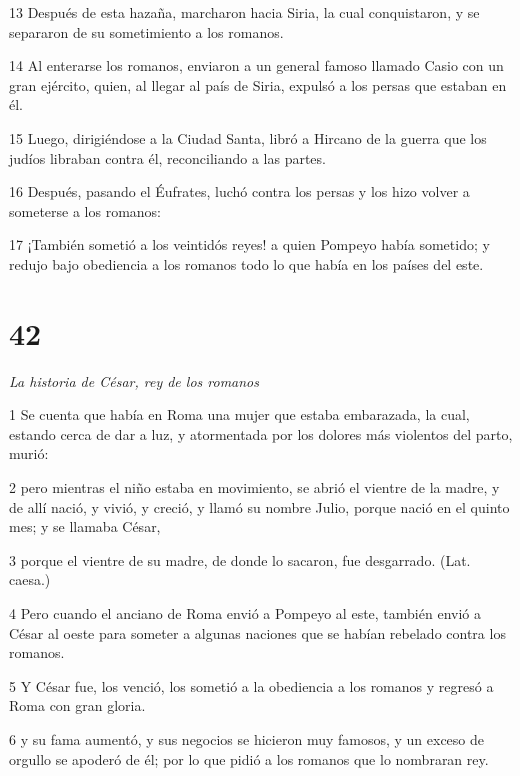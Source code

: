 \par 13 Después de esta hazaña, marcharon hacia Siria, la cual conquistaron, y se separaron de su sometimiento a los romanos.

\par 14 Al enterarse los romanos, enviaron a un general famoso llamado Casio con un gran ejército, quien, al llegar al país de Siria, expulsó a los persas que estaban en él.

\par 15 Luego, dirigiéndose a la Ciudad Santa, libró a Hircano de la guerra que los judíos libraban contra él, reconciliando a las partes.

\par 16 Después, pasando el Éufrates, luchó contra los persas y los hizo volver a someterse a los romanos:

\par 17 ¡También sometió a los veintidós reyes! a quien Pompeyo había sometido; y redujo bajo obediencia a los romanos todo lo que había en los países del este.

\chapter{42}

\par \textit{La historia de César, rey de los romanos}

\par 1 Se cuenta que había en Roma una mujer que estaba embarazada, la cual, estando cerca de dar a luz, y atormentada por los dolores más violentos del parto, murió:

\par 2 pero mientras el niño estaba en movimiento, se abrió el vientre de la madre, y de allí nació, y vivió, y creció, y llamó su nombre Julio, porque nació en el quinto mes; y se llamaba César,

\par 3 porque el vientre de su madre, de donde lo sacaron, fue desgarrado. (Lat. caesa.)

\par 4 Pero cuando el anciano de Roma envió a Pompeyo al este, también envió a César al oeste para someter a algunas naciones que se habían rebelado contra los romanos.

\par 5 Y César fue, los venció, los sometió a la obediencia a los romanos y regresó a Roma con gran gloria.

\par 6 y su fama aumentó, y sus negocios se hicieron muy famosos, y un exceso de orgullo se apoderó de él; por lo que pidió a los romanos que lo nombraran rey.

